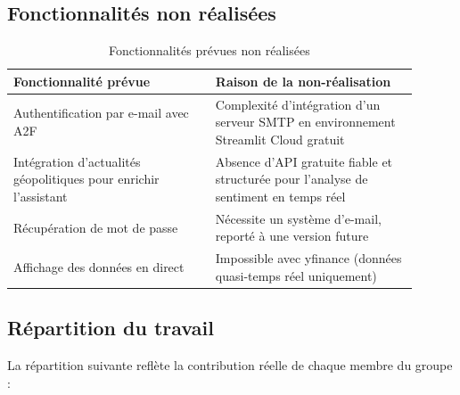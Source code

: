 \documentclass[a4paper, 12pt, twoside]{article}
\begin{document}
\subsection{Fonctionnalités non réalisées}

\begin{table}[h]
\begin{center}
\begin{tabular}{|p{0.45\linewidth}|p{0.45\linewidth}|}
\hline
\textbf{Fonctionnalité prévue} & \textbf{Raison de la non-réalisation} \\
\hline
Authentification par e-mail avec A2F &
    Complexité d'intégration d'un serveur SMTP en environnement
    Streamlit Cloud gratuit \\
\hline
Intégration d'actualités géopolitiques pour enrichir l'assistant &
    Absence d'API gratuite fiable et structurée pour l'analyse de
    sentiment en temps réel \\
\hline
Récupération de mot de passe &
    Nécessite un système d'e-mail, reporté à une version future \\
\hline
Affichage des données en direct &
    Impossible avec yfinance (données quasi-temps réel uniquement) \\
\hline
\end{tabular}
\end{center}
\caption{Fonctionnalités prévues non réalisées}
\label{tab:nonrealise}
\end{table}

\subsection{Répartition du travail}

La répartition suivante reflète la contribution réelle de chaque membre
du groupe :
\end{document}
